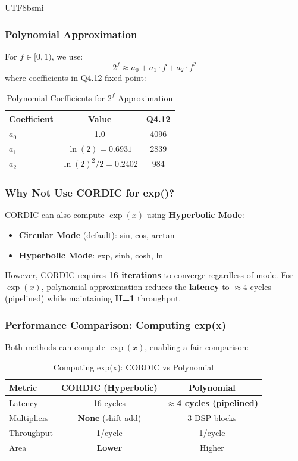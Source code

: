 \documentclass[journal,twoside]{IEEEtran}
\begin{document}
\begin{CJK}{UTF8}{bsmi}
\subsubsection{Polynomial Approximation}
For $f \in [0, 1)$, we use:
\begin{equation}
2^f \approx a_0 + a_1 \cdot f + a_2 \cdot f^2
\end{equation}
where coefficients in Q4.12 fixed-point:
\begin{table}[!t]
\centering
\caption{Polynomial Coefficients for $2^f$ Approximation}
\footnotesize
\begin{tabular}{@{}lcc@{}}
\toprule
\textbf{Coefficient} & \textbf{Value} & \textbf{Q4.12} \\
\midrule
$a_0$ & 1.0 & 4096 \\
$a_1$ & $\ln(2) = 0.6931$ & 2839 \\
$a_2$ & $\ln(2)^2/2 = 0.2402$ & 984 \\
\bottomrule
\end{tabular}
\end{table}

\subsubsection{Why Not Use CORDIC for exp()?}
CORDIC can also compute $\exp(x)$ using \textbf{Hyperbolic Mode}:
\begin{itemize}
    \item \textbf{Circular Mode} (default): sin, cos, arctan
    \item \textbf{Hyperbolic Mode}: exp, sinh, cosh, ln
\end{itemize}

However, CORDIC requires \textbf{16 iterations} to converge regardless of mode. For $\exp(x)$, polynomial approximation reduces the \textbf{latency} to $\approx$4 cycles (pipelined) while maintaining \textbf{II=1} throughput.

\subsubsection{Performance Comparison: Computing exp(x)}
Both methods can compute $\exp(x)$, enabling a fair comparison:

\begin{table}[!t]
\centering
\caption{Computing exp(x): CORDIC vs Polynomial}
\footnotesize
\begin{tabular}{@{}lcc@{}}
\toprule
\textbf{Metric} & \textbf{CORDIC (Hyperbolic)} & \textbf{Polynomial} \\
\midrule
Latency & 16 cycles & \textbf{$\approx$4 cycles (pipelined)} \\
Multipliers & \textbf{None} (shift-add) & 3 DSP blocks \\
Throughput & 1/cycle & 1/cycle \\
Area & \textbf{Lower} & Higher \\
\bottomrule
\end{tabular}
\end{table}


\end{CJK}
\end{document}
